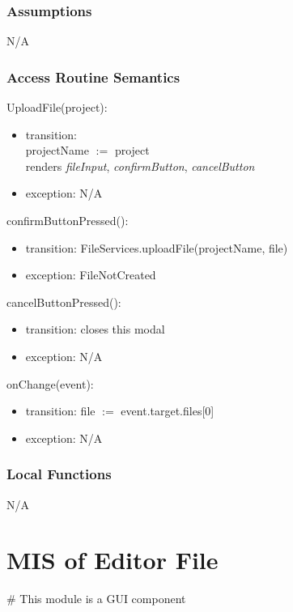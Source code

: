 \documentclass[12pt, titlepage]{article}
\begin{document}
	\subsubsection{Assumptions}
	N/A
	
	\subsubsection{Access Routine Semantics}
	
	\noindent UploadFile(project):
	\begin{itemize}
		\item transition:\\
		projectName $:=$ project \\
		renders \textit{fileInput}, \textit{confirmButton}, \textit{cancelButton}
		\item exception: N/A
	\end{itemize}
	
	\noindent confirmButtonPressed():
	\begin{itemize}
		\item transition: FileServices.uploadFile(projectName, file)\\
		\item exception: FileNotCreated
	\end{itemize}
	
	\noindent cancelButtonPressed():
	\begin{itemize}
		\item transition: closes this modal
		\item exception: N/A
	\end{itemize}
	
	\noindent onChange(event):
	\begin{itemize}
		\item transition: file $:=$ event.target.files[0]
		\item exception: N/A
	\end{itemize}
	
	\subsubsection{Local Functions}
	
	N/A
	
	
	\newpage
	
	
	\section{MIS of Editor File} \label{Module} 
	\# This module is a GUI component
\end{document}
